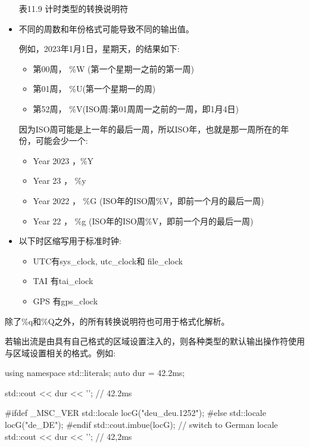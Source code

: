 \begin{itemize}
\begin{center}
表11.9 计时类型的转换说明符
\end{center}

\item 
不同的周数和年份格式可能导致不同的输出值。

例如，2023年1月1日，星期天，的结果如下:

\begin{itemize}
\item 
第00周， \%W (第一个星期一之前的第一周)

\item 
第01周， \%U(第一个星期一的周)

\item 
第52周， \%V(ISO周:第01周周一之前的一周，即1月4日)
\end{itemize}

因为ISO周可能是上一年的最后一周，所以ISO年，也就是那一周所在的年份，可能会少一个:

\begin{itemize}
\item 
Year 2023 ，\%Y

\item 
Year 23 ， \%y

\item 
Year 2022 ， \%G (ISO年的ISO周\%V，即前一个月的最后一周)

\item 
Year 22 ， \%g (ISO年的ISO周\%V，即前一个月的最后一周)
\end{itemize}

\item 
以下时区缩写用于标准时钟:

\begin{itemize}
\item 
UTC有sys\_clock, utc\_clock和 file\_clock

\item 
TAI 有tai\_clock

\item 
GPS 有gps\_clock
\end{itemize}
\end{itemize}

除了\%q和\%Q之外，的所有转换说明符也可用于格式化解析。


若输出流是由具有自己格式的区域设置注入的，则各种类型的默认输出操作符使用与区域设置相关的格式。例如:

\begin{cpp}
using namespace std::literals;
auto dur = 42.2ms;

std::cout << dur << '\n'; // 42.2ms

#ifdef _MSC_VER
	std::locale locG("deu_deu.1252");
#else
	std::locale locG("de_DE");
#endif
std::cout.imbue(locG); // switch to German locale
std::cout << dur << '\n'; // 42,2ms
\end{cpp}

